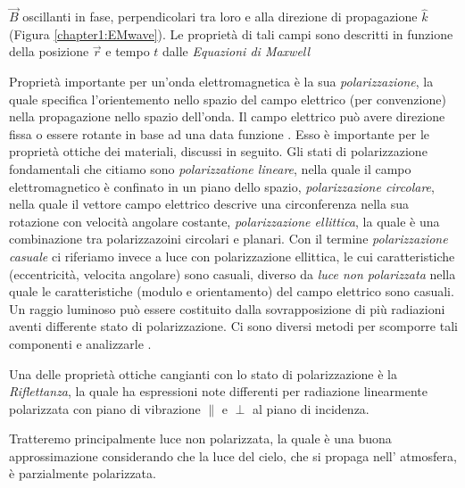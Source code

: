 $\overrightarrow{B}$ oscillanti in fase, perpendicolari tra loro e alla direzione di propagazione $\hat{k}$ (Figura \ref{chapter1:EMwave}). 
Le propriet\`a di tali campi sono descritti in funzione della posizione $\overrightarrow{r}$ e tempo $t$ dalle \textit{Equazioni di Maxwell}
\cite{pegoraro}\par
Propriet\`a importante per un'onda elettromagnetica \`e la sua \textit{polarizzazione}, la quale specifica l'orientemento nello spazio del campo
elettrico (per convenzione) nella propagazione nello spazio dell'onda. Il campo elettrico pu\`o avere direzione fissa o essere rotante in base ad una
data funzione \cite{rad-phot}. Esso \`e importante per le propriet\`a ottiche dei materiali, discussi in seguito. Gli stati di polarizzazione 
fondamentali che citiamo sono \textit{polarizzatione lineare}, nella quale il campo elettromagnetico \`e confinato in un piano dello spazio, 
\textit{polarizzazione circolare}, nella quale il vettore campo elettrico descrive una circonferenza nella sua rotazione con velocit\`a angolare 
costante, \textit{polarizzazione ellittica}, la quale \`e una combinazione tra polarizzazoini circolari e planari. Con il termine 
\textit{polarizzazione casuale} ci riferiamo invece a luce con polarizzazione ellittica, le cui caratteristiche (eccentricit\`a, velocita angolare) 
sono casuali, diverso da \textit{luce non polarizzata} nella quale le caratteristiche (modulo e orientamento) del campo elettrico sono casuali.
Un raggio luminoso pu\`o essere costituito dalla sovrapposizione di pi\`u radiazioni aventi differente stato di polarizzazione. Ci sono diversi metodi 
per scomporre tali componenti e analizzarle \cite{hecht}.\par
Una delle propriet\`a ottiche cangianti con lo stato di polarizzazione \`e la \textit{Riflettanza}, la quale ha espressioni note differenti per 
radiazione linearmente polarizzata con piano di vibrazione $\parallel$ e $\perp$ al piano di incidenza.\par
Tratteremo principalmente luce non polarizzata, la quale \`e una buona approssimazione considerando che la luce del cielo, che si propaga nell'
atmosfera, \`e parzialmente polarizzata.
